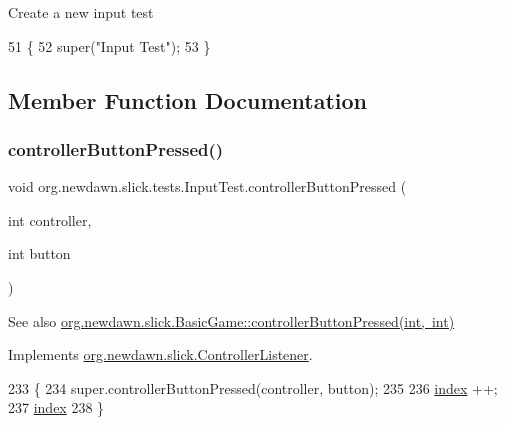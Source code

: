 Create a new input test 
\begin{DoxyCode}
51                        \{
52         super(\textcolor{stringliteral}{"Input Test"});
53     \}
\end{DoxyCode}


\subsection{Member Function Documentation}
\mbox{\label{classorg_1_1newdawn_1_1slick_1_1tests_1_1_input_test_a7b7b3c980b5b222fbcec4eb5ff5b2590}} 
\subsubsection{\texorpdfstring{controller\+Button\+Pressed()}{controllerButtonPressed()}}
{\footnotesize\ttfamily void org.\+newdawn.\+slick.\+tests.\+Input\+Test.\+controller\+Button\+Pressed (\begin{DoxyParamCaption}\item[{int}]{controller,  }\item[{int}]{button }\end{DoxyParamCaption})\hspace{0.3cm}{\ttfamily [inline]}}

\begin{DoxySeeAlso}{See also}
\mbox{\hyperlink{classorg_1_1newdawn_1_1slick_1_1_basic_game_a9d83c85e4046945a3459debf55079697}{org.\+newdawn.\+slick.\+Basic\+Game\+::controller\+Button\+Pressed(int, int)}} 
\end{DoxySeeAlso}


Implements \mbox{\hyperlink{interfaceorg_1_1newdawn_1_1slick_1_1_controller_listener_ae6feac165a8d0eded01f38de12f239ff}{org.\+newdawn.\+slick.\+Controller\+Listener}}.


\begin{DoxyCode}
233                                                                     \{
234         super.controllerButtonPressed(controller, button);
235         
236         \mbox{\hyperlink{classorg_1_1newdawn_1_1slick_1_1tests_1_1_input_test_a9081fd3676382bf0fc4160dbe0d4738e}{index}} ++;
237         \mbox{\hyperlink{classorg_1_1newdawn_1_1slick_1_1tests_1_1_input_test_a9081fd3676382bf0fc4160dbe0d4738e}{index}} %
238     \}
\end{DoxyCode}
\mbox{\label{classorg_1_1newdawn_1_1slick_1_1tests_1_1_input_test_a05e59c7c9566b28949f6362292341558}} 
